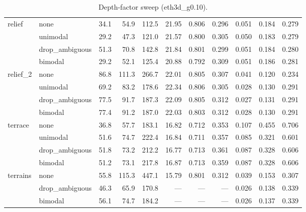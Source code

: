 \begin{table}[h]
\begin{tabular}{llrrrrrrrrr}
\midrule
\multirow{4}{*}{relief} & none & 34.1 & 54.9 & 112.5 & 21.95 & 0.806 & 0.296 & 0.051 & 0.184 & 0.279 \\
 & unimodal & 29.2 & 47.3 & 121.0 & 21.57 & 0.800 & 0.305 & 0.050 & 0.183 & 0.279 \\
 & drop_ambiguous & 51.3 & 70.8 & 142.8 & 21.84 & 0.801 & 0.299 & 0.051 & 0.184 & 0.280 \\
 & bimodal & 29.2 & 52.1 & 125.4 & 20.88 & 0.792 & 0.309 & 0.051 & 0.186 & 0.281 \\
\midrule
\multirow{4}{*}{relief_2} & none & 86.8 & 111.3 & 266.7 & 22.01 & 0.805 & 0.307 & 0.041 & 0.120 & 0.234 \\
 & unimodal & 69.2 & 83.2 & 178.6 & 22.34 & 0.806 & 0.305 & 0.028 & 0.130 & 0.291 \\
 & drop_ambiguous & 77.5 & 91.7 & 187.3 & 22.09 & 0.805 & 0.312 & 0.027 & 0.131 & 0.291 \\
 & bimodal & 77.4 & 91.2 & 187.0 & 22.03 & 0.803 & 0.312 & 0.028 & 0.130 & 0.291 \\
\midrule
\multirow{4}{*}{terrace} & none & 36.8 & 57.7 & 183.1 & 16.82 & 0.712 & 0.353 & 0.107 & 0.455 & 0.706 \\
 & unimodal & 51.6 & 74.7 & 222.4 & 16.84 & 0.711 & 0.357 & 0.085 & 0.321 & 0.601 \\
 & drop_ambiguous & 51.8 & 73.2 & 212.2 & 16.77 & 0.713 & 0.361 & 0.087 & 0.328 & 0.606 \\
 & bimodal & 51.2 & 73.1 & 217.8 & 16.87 & 0.713 & 0.359 & 0.087 & 0.328 & 0.606 \\
\midrule
\multirow{3}{*}{terrains} & none & 55.8 & 115.3 & 447.1 & 15.79 & 0.801 & 0.312 & 0.039 & 0.153 & 0.307 \\
 & drop_ambiguous & 46.3 & 65.9 & 170.8 & --- & --- & --- & 0.026 & 0.138 & 0.339 \\
 & bimodal & 56.1 & 74.7 & 184.2 & --- & --- & --- & 0.026 & 0.137 & 0.339 \\
\bottomrule
\end{tabular}
\caption{Depth-factor sweep (eth3d_g0.10).}
\label{tab:eth3d_g0.10}
\end{table}